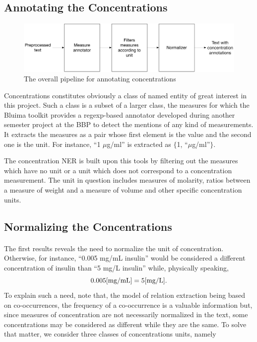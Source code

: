\documentclass{report}
\begin{document}
				\subsection{Annotating the Concentrations}
				\begin{figure}[h!]
					\centering
					\includegraphics[width=\textwidth]{fig/concentration_pipeline.pdf}
					\caption{The overall pipeline for annotating concentrations}
					\label{fig:concentration_pipeline}
				\end{figure}
				
				Concentrations constitutes obviously a class of named entity of great interest in this project. 
				Such a class is a subset of a larger class, 
				the measures for which the Bluima toolkit \cite{bluima} provides a
                regexp-based annotator developed during another semester project 
                \cite{portmann} at the BBP to detect the mentions of any
                kind of measurements. It extracts the measures as a pair whose 
                first element is the value and the second one is the unit. For 
                instance, ``1 $\mu$g/ml'' is extracted as $\{$1, ``$\mu$g/ml''$\}$. 
                
                The concentration NER is built upon this tools  by filtering 
                out the measures which have no unit or a unit which does not 
                correspond to a concentration measurement. The unit in question
                includes measures of molarity, ratios between a measure of weight 
                and a measure of volume and other specific concentration units.
				
				\subsection{Normalizing the Concentrations}
				\paragraph{}The first results reveals the need to normalize the
				unit of concentration. Otherwise, for instance, ``0.005 mg/mL insulin'' 
				would be considered a different concentration of insulin than 
				``5 mg/L insulin'' while, physically speaking,
				$$0.005 [\textup{mg/mL}] = 5 [\textup{mg/L}].$$
				To explain such a need, note that, the model of relation extraction being 
				based on co-occurrences, the frequency of a co-occurrence is a 
				valuable information but, since measures of concentration 
				are not necessarily normalized in the text, some concentrations 
				may be considered as different while they are the same. To solve
				that matter, we consider three classes of concentrations units, 
				namely
                
\end{document}
